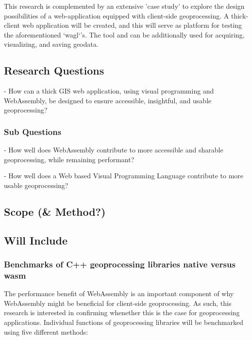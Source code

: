 This research is complemented by an extensive 'case study' to explore the design possibilities of a web-application equipped with client-side geoprocessing. 
A thick-client web application will be created, and this will serve as platform for testing the aforementioned `wagl`'s. 
The tool and can be additionally used for acquiring, visualizing, and saving geodata. 


\subsection{Research Questions}

- How can a thick GIS web application, using visual programming and WebAssembly, be designed to ensure accessible, insightful, and usable geoprocessing?

\subsubsection*{Sub Questions}

- How well does WebAssembly contribute to more accessible and sharable geoprocessing, while remaining performant? 

- How well does a Web based Visual Programming Language contribute to more usable geoprocessing?


\newpage
\subsection{Scope (\& Method?)}


\subsection*{Will Include}

\subsubsection*{Benchmarks of C++ geoprocessing libraries native versus wasm}

The performance benefit of WebAssembly is an important component of why WebAssembly might be beneficial for client-side geoprocessing. As such, this research is interested in confirming whenether this is the case for geoprocessing applications. Individual functions of geoprocessing libraries will be benchmarked using five different methods: 

